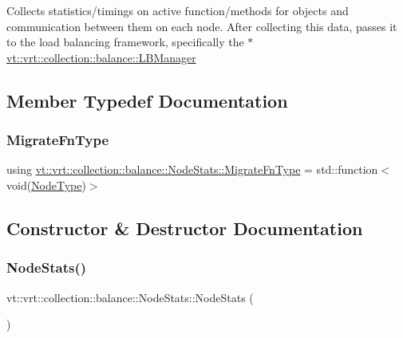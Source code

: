 Collects statistics/timings on active function/methods for objects and communication between them on each node. After collecting this data, passes it to the load balancing framework, specifically the {\ttfamily $\ast$} \hyperlink{structvt_1_1vrt_1_1collection_1_1balance_1_1_l_b_manager}{vt\+::vrt\+::collection\+::balance\+::\+L\+B\+Manager} 

\subsection{Member Typedef Documentation}
\mbox{\label{structvt_1_1vrt_1_1collection_1_1balance_1_1_node_stats_af702e521887d9015e33a7aedda48d09d}} 
\subsubsection{\texorpdfstring{Migrate\+Fn\+Type}{MigrateFnType}}
{\footnotesize\ttfamily using \hyperlink{structvt_1_1vrt_1_1collection_1_1balance_1_1_node_stats_af702e521887d9015e33a7aedda48d09d}{vt\+::vrt\+::collection\+::balance\+::\+Node\+Stats\+::\+Migrate\+Fn\+Type} =  std\+::function$<$void(\hyperlink{namespacevt_a866da9d0efc19c0a1ce79e9e492f47e2}{Node\+Type})$>$}



\subsection{Constructor \& Destructor Documentation}
\mbox{\label{structvt_1_1vrt_1_1collection_1_1balance_1_1_node_stats_a05936543d7f0f41a55c77fe5265ca8ed}} 
\subsubsection{\texorpdfstring{Node\+Stats()}{NodeStats()}}
{\footnotesize\ttfamily vt\+::vrt\+::collection\+::balance\+::\+Node\+Stats\+::\+Node\+Stats (\begin{DoxyParamCaption}{ }\end{DoxyParamCaption})\hspace{0.3cm}{\ttfamily [default]}}



